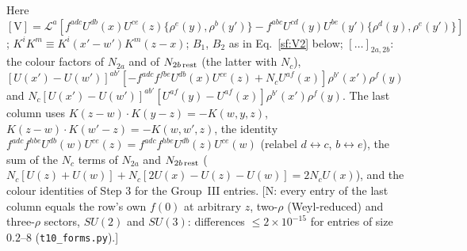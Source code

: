 Here $[\text{V}]=\mathcal{L}^{a}[f^{adc}U^{db}(x)U^{ce}(z)\{\rho^{e}(y),\rho^{b}(y')\}-f^{abc}U^{cd}(y)U^{be}(y')\{\rho^{d}(y),\rho^{e}(y')\}]$; $K^{i}K^{m}\equiv K^{i}(x'-w')K^{m}(z-x)$; $B_{1}$, $B_{2}$ as in Eq.~\eqref{sf:V2} below; $[\dots]_{2a,2b}$: the colour factors of $N_{2a}$ and of $N_{2b\,\rm rest}$ (the latter with $N_{c}$), $[U(x')-U(w')]^{ab'}[-f^{adc}f^{fbe}U^{db}(x)U^{ce}(z)+N_{c}U^{af}(x)]\rho^{b'}(x')\rho^{f}(y)$ and $N_{c}[U(x')-U(w')]^{ab'}[U^{af}(y)-U^{af}(x)]\rho^{b'}(x')\rho^{f}(y)$. The last column uses $K(z-w)\cdot K(y-z)=-K(w,y,z)$, $K(z-w)\cdot K(w'-z)=-K(w,w',z)$, the identity $f^{adc}f^{hbe}U^{db}(w)U^{ce}(z)=f^{adc}f^{hbe}U^{db}(z)U^{ce}(w)$ (relabel $d\leftrightarrow c$, $b\leftrightarrow e$), the sum of the $N_{c}$ terms of $N_{2a}$ and $N_{2b\,\rm rest}$ ($N_{c}[U(z)+U(w)]+N_{c}[2U(x)-U(z)-U(w)]=2N_{c}U(x)$), and the colour identities of Step 3 for the Group~III entries. [N: every entry of the last column equals the row's own $f(0)$ at arbitrary $z$, two-$\rho$ (Weyl-reduced) and three-$\rho$ sectors, $SU(2)$ and $SU(3)$: differences $\le2\times10^{-15}$ for entries of size $0.2$--$8$ (\texttt{t10\_forms.py}).]

